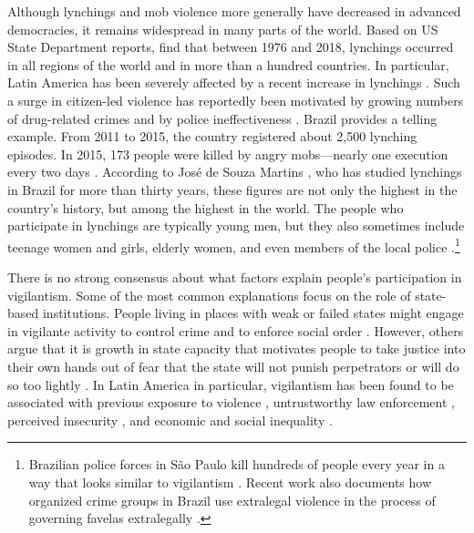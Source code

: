 \documentclass[12pt,a4paper]{article}
\begin{document}
Although lynchings and mob violence more generally have decreased in advanced
democracies, it remains widespread in many parts of the world. Based on US
State Department reports, \citet[33]{jung2020lynching} find that between 1976
and 2018, lynchings occurred in all regions of the world and in more than a
hundred countries. In particular, Latin America has been severely affected by a
recent increase in lynchings \citep{godoy2004justice, kloppe2020vortex}.
Such a surge in citizen-led violence has reportedly been motivated by growing
numbers of drug-related crimes and by police ineffectiveness
\citep{mallen2014vigilantes}. Brazil provides a telling example. From 2011 to
2015, the country registered about 2,500 lynching episodes. In 2015, 173 people
were killed by angry mobs---nearly one execution every two days
\citep{barbara2015vigilantes, oliveira2016mob}. According to José de Souza
Martins \citeyearpar{martins2015linchamentos}, who has studied lynchings in
Brazil for more than thirty years, these figures are not only the highest in
the country's history, but among the highest in the world. The people who
participate in lynchings are typically young men, but they also sometimes
include teenage women and girls, elderly women, and even members of the local
police \citep{moura2017linchamentos}.\footnote{Brazilian police forces in São
  Paulo kill hundreds of people every year in a way that looks similar to
vigilantism \citep{willis2015killing}. Recent work also documents how organized
crime groups in Brazil use extralegal violence in the process of governing
favelas extralegally \citep{magaloni2020killing}.}

There is no strong consensus about what factors explain people's participation
in vigilantism. Some of the most common explanations focus on the role of
state-based institutions. People living in places with weak or failed states
might engage in vigilante activity to control crime and to enforce social order
\citep{bancroft1887works}. However, others argue that it is growth in state
capacity that motivates people to take justice into their own hands out of fear
that the state will not punish perpetrators or will do so too lightly
\citep{smith2019contradictions}. In Latin America in particular, vigilantism
has been found to be associated with previous exposure to violence
\citep{garcia2019anger}, untrustworthy law enforcement
\citep{zizumbo2017community}, perceived insecurity \citep{ceobanu2011crime,
godoy2004justice}, and economic and social inequality
\citep{phillips2017inequality,godoy2006popular,arias2010violent}.
\end{document}

